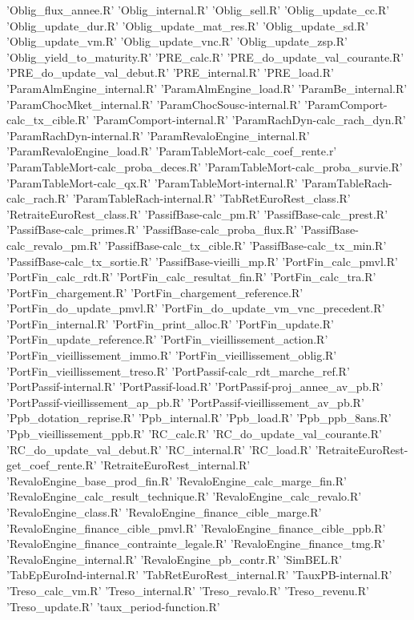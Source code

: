 \documentclass[a4paper]{book}
\begin{document}
\begin{description}
{'Oblig\_flux\_annee.R' 'Oblig\_internal.R' 'Oblig\_sell.R'
'Oblig\_update\_cc.R' 'Oblig\_update\_dur.R'
'Oblig\_update\_mat\_res.R' 'Oblig\_update\_sd.R'
'Oblig\_update\_vm.R' 'Oblig\_update\_vnc.R' 'Oblig\_update\_zsp.R'
'Oblig\_yield\_to\_maturity.R' 'PRE\_calc.R'
'PRE\_do\_update\_val\_courante.R' 'PRE\_do\_update\_val\_debut.R'
'PRE\_internal.R' 'PRE\_load.R' 'ParamAlmEngine\_internal.R'
'ParamAlmEngine\_load.R' 'ParamBe\_internal.R'
'ParamChocMket\_internal.R' 'ParamChocSousc-internal.R'
'ParamComport-calc\_tx\_cible.R' 'ParamComport-internal.R'
'ParamRachDyn-calc\_rach\_dyn.R' 'ParamRachDyn-internal.R'
'ParamRevaloEngine\_internal.R' 'ParamRevaloEngine\_load.R'
'ParamTableMort-calc\_coef\_rente.r'
'ParamTableMort-calc\_proba\_deces.R'
'ParamTableMort-calc\_proba\_survie.R' 'ParamTableMort-calc\_qx.R'
'ParamTableMort-internal.R' 'ParamTableRach-calc\_rach.R'
'ParamTableRach-internal.R' 'TabRetEuroRest\_class.R'
'RetraiteEuroRest\_class.R' 'PassifBase-calc\_pm.R'
'PassifBase-calc\_prest.R' 'PassifBase-calc\_primes.R'
'PassifBase-calc\_proba\_flux.R' 'PassifBase-calc\_revalo\_pm.R'
'PassifBase-calc\_tx\_cible.R' 'PassifBase-calc\_tx\_min.R'
'PassifBase-calc\_tx\_sortie.R' 'PassifBase-vieilli\_mp.R'
'PortFin\_calc\_pmvl.R' 'PortFin\_calc\_rdt.R'
'PortFin\_calc\_resultat\_fin.R' 'PortFin\_calc\_tra.R'
'PortFin\_chargement.R' 'PortFin\_chargement\_reference.R'
'PortFin\_do\_update\_pmvl.R'
'PortFin\_do\_update\_vm\_vnc\_precedent.R' 'PortFin\_internal.R'
'PortFin\_print\_alloc.R' 'PortFin\_update.R'
'PortFin\_update\_reference.R' 'PortFin\_vieillissement\_action.R'
'PortFin\_vieillissement\_immo.R'
'PortFin\_vieillissement\_oblig.R'
'PortFin\_vieillissement\_treso.R'
'PortPassif-calc\_rdt\_marche\_ref.R' 'PortPassif-internal.R'
'PortPassif-load.R' 'PortPassif-proj\_annee\_av\_pb.R'
'PortPassif-vieillissement\_ap\_pb.R'
'PortPassif-vieillissement\_av\_pb.R' 'Ppb\_dotation\_reprise.R'
'Ppb\_internal.R' 'Ppb\_load.R' 'Ppb\_ppb\_8ans.R'
'Ppb\_vieillissement\_ppb.R' 'RC\_calc.R'
'RC\_do\_update\_val\_courante.R' 'RC\_do\_update\_val\_debut.R'
'RC\_internal.R' 'RC\_load.R' 'RetraiteEuroRest-get\_coef\_rente.R'
'RetraiteEuroRest\_internal.R' 'RevaloEngine\_base\_prod\_fin.R'
'RevaloEngine\_calc\_marge\_fin.R'
'RevaloEngine\_calc\_result\_technique.R'
'RevaloEngine\_calc\_revalo.R' 'RevaloEngine\_class.R'
'RevaloEngine\_finance\_cible\_marge.R'
'RevaloEngine\_finance\_cible\_pmvl.R'
'RevaloEngine\_finance\_cible\_ppb.R'
'RevaloEngine\_finance\_contrainte\_legale.R'
'RevaloEngine\_finance\_tmg.R' 'RevaloEngine\_internal.R'
'RevaloEngine\_pb\_contr.R' 'SimBEL.R' 'TabEpEuroInd-internal.R'
'TabRetEuroRest\_internal.R' 'TauxPB-internal.R'
'Treso\_calc\_vm.R' 'Treso\_internal.R' 'Treso\_revalo.R'
'Treso\_revenu.R' 'Treso\_update.R' 'taux\_period-function.R'}
\end{description}
\end{document}
